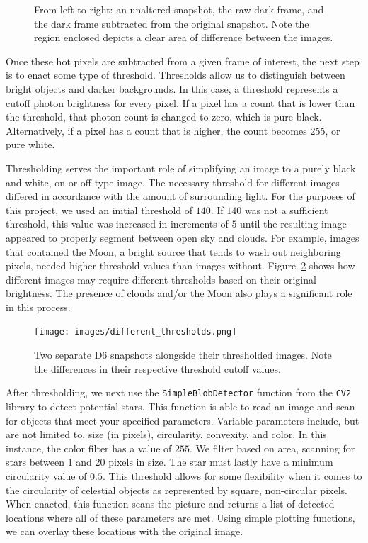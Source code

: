 \begin{figure}[ht!]
  \caption{From left to right: an unaltered snapshot, the raw dark frame, and the dark frame subtracted from the original snapshot.  Note the region enclosed depicts a clear area of difference between the images.}
  \label{hotpix}
\end{figure}


Once these hot pixels are subtracted from a given frame of interest, the next step is to enact some type of threshold.
Thresholds allow us to distinguish between bright objects and darker backgrounds.
In this case, a threshold represents a cutoff photon brightness for every pixel.  
If a pixel has a count that is lower than the threshold, that photon count is changed to zero, which is pure black.  
Alternatively, if a pixel has a count that is higher, the  count becomes 255, or pure white.  

Thresholding serves the important role of simplifying an image to a purely black and white, on or off type image.
The necessary threshold for different images differed in accordance with the amount of surrounding light.
For the purposes of this project, we used an initial threshold of $140$.
If $140$ was not a sufficient threshold, this value was increased in increments of $5$ until the resulting image appeared to properly segment between open sky and clouds. 
For example, images that contained the Moon, a bright source that tends to wash out neighboring pixels, needed higher threshold values than images without.
Figure~\ref{dif_thresholds} shows how different images may require different thresholds based on their original brightness.
The presence of clouds and/or the Moon also plays a significant role in this process.

\begin{figure}[ht!]
  \centering
  \texttt{[image: images/different\_thresholds.png]}
  \caption{Two separate D6 snapshots alongside their thresholded images.  Note the differences in their respective threshold cutoff values.}
  \label{dif_thresholds}
\end{figure}


After thresholding, we next use the \texttt{SimpleBlobDetector} function from the \texttt{CV2} library to detect potential stars.
This function is able to read an image and scan for objects that meet your specified parameters.
Variable parameters include, but are not limited to, size (in pixels), circularity, convexity, and color.
In this instance, the color filter has a value of $255$.
We filter based on area, scanning for stars between 1 and 20 pixels in size.
The star must lastly have a minimum circularity value of $0.5$.
This threshold allows for some flexibility when it comes to the circularity of celestial objects as represented by square, non-circular pixels.
When enacted, this function scans the picture and returns a list of detected locations where all of these parameters are met.
Using simple plotting functions, we can overlay these locations with the original image.

